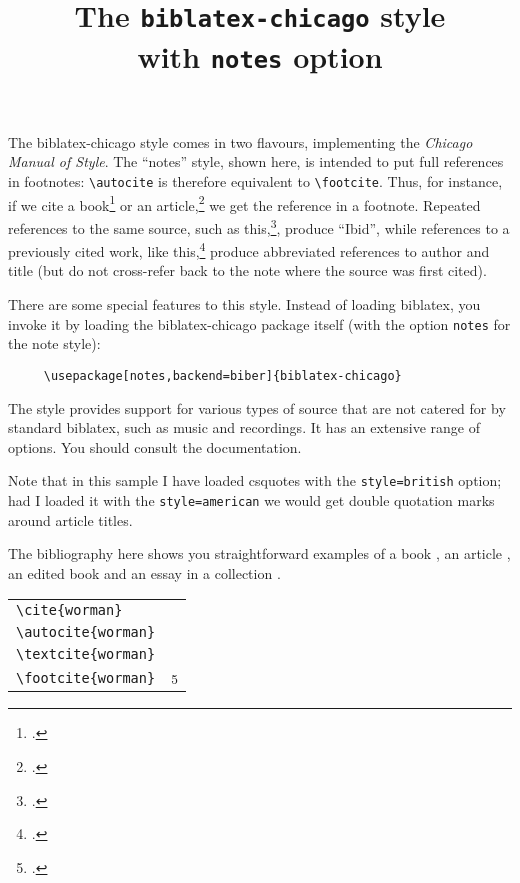 \documentclass[varwidth=\textwidth,class=article,border=5pt]{standalone}
\begin{document}
\title{The \texttt{biblatex-chicago} style\\with \texttt{notes} option}
\author{}\date{}
\maketitle

The \textsf{biblatex-chicago} style comes in two flavours, implementing the \emph{Chicago Manual of Style}. The \enquote{notes} style, shown here, is intended to put full references in footnotes: \verb|\autocite| is therefore equivalent to \verb|\footcite|. Thus, for instance, if we cite a book\footcite{worman} or an article,\footcite{reese} we get the reference in a footnote. Repeated references to the same source, such as this,\footcite{reese}, produce \enquote{Ibid}, while references to a previously cited work, like this,\footcite{worman} produce abbreviated references to author and title (but do not cross-refer back to the note where the source was first cited).

\quad There are some special features to this style. Instead of loading \textsf{biblatex}, you invoke it by loading the \textsf{biblatex-chicago} package itself (with the option \verb|notes| for the note style):
\begin{verbatim}
     \usepackage[notes,backend=biber]{biblatex-chicago}
\end{verbatim}
The style provides support for various types of source that are not catered for by standard \textsf{biblatex}, such as music and recordings. It has an extensive range of options. You should consult the documentation.

\quad Note that in this sample I have loaded \textsf{csquotes} with the \verb~style=british~ option; had I loaded it with the \verb~style=american~ we would get double quotation marks around article titles.

\quad The bibliography here shows you straightforward examples of a book \autocite{worman}, an article \autocite{reese}, an edited book \autocite{aristotle:anima} and an essay in a collection \autocite{gaonkar:in}.

\medskip

\begin{tabular}{ll}
\verb|\cite{worman}| & \cite{worman} \\
\verb|\autocite{worman}| & \strut\autocite{worman} \\
\verb|\textcite{worman}| & \textcite{worman} \\
\verb|\footcite{worman}| & \strut\footcite{worman}
\end{tabular}

\printbibliography
\end{document}
